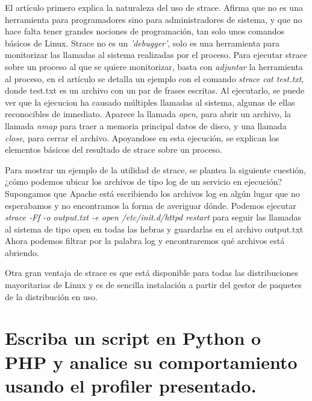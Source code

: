 El artículo primero explica la naturaleza del uso de strace. Afirma que no es una herramienta para programadores sino para administradores de sistema, y que no hace
falta tener grandes nociones de programación, tan solo unos comandos básicos de Linux. Strace no es un \textit{'debugger'}, solo es una herramienta para monitorizar
las llamadas al sistema realizadas por el proceso. Para ejecutar strace sobre un proceso al que se quiere monitorizar, basta
con \textit{adjuntar} la herramienta al proceso, en el artículo se detalla un ejemplo con el comando \textit{strace cat test.txt}, donde test.txt es un archivo con un par de 
frases escritas. Al ejecutarlo, se puede ver que la ejecucion ha causado múltiples llamadas al sistema, algunas de ellas reconocibles de inmediato. Aparece la
llamada \textit{open}, para abrir un archivo, la llamada \textit{nmap} para traer a memoria principal datos de disco, y una llamada \textit{close}, para cerrar el 
archivo. Apoyandose en esta ejecución, se explican los elementos básicos del resultado de strace sobre un proceso. 

\vspace{5mm}

Para mostrar un ejemplo de la utilidad de strace, se plantea la siguiente cuestión, ¿cómo podemos ubicar los archivos de tipo log de un servicio en ejecución? 
Supongamos que Apache está escribiendo los archivos log en algún lugar que no esperabamos y no encontramos la forma de averiguar dónde. Podemos ejecutar
\textit{strace -Ff -o output.txt -e open /etc/init.d/httpd restart} para seguir las llamadas al sistema de tipo open en todas las hebras y guardarlas en el archivo output.txt
Ahora podemos filtrar por la palabra log y encontraremos qué archivos está abriendo. 

\vspace{5mm}

Otra gran ventaja de strace es que está disponible para todas las distribuciones mayoritarias de Linux y es de sencilla instalación a partir del gestor de paquetes
de la distribución en uso.







\section{Escriba un script en Python o PHP y analice su comportamiento usando el profiler presentado.}

